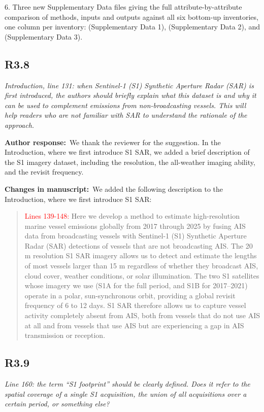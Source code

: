 \documentclass[11pt]{article}
\newcommand{\point}[1]{\subsection*{\normalfont\bfseries #1}}
\newcommand{\response}{\par\medskip\noindent%
  \textbf{\textcolor{respblue}{Author response:}}\ }
\newcommand{\changes}{\par\medskip\noindent%
  \textbf{\textcolor{changegreen}{Changes in manuscript:}}\ }
\begin{document}
6. Three new Supplementary Data files giving the full attribute-by-attribute comparison of methods, inputs and outputs against all six bottom-up inventories, one column per inventory:  (Supplementary Data 1),  (Supplementary Data 2), and  (Supplementary Data 3).


\point{R3.8}

\begin{refquote}\itshape
Introduction, line 131: when Sentinel-1 (S1) Synthetic Aperture Radar (SAR) is first introduced, the authors should briefly explain what this dataset is and why it can be used to complement emissions from non-broadcasting vessels. This will help readers who are not familiar with SAR to understand the rationale of the approach.

\end{refquote}

\response We thank the reviewer for the suggestion. In the Introduction, where we first introduce S1 SAR, we added a brief description of the S1 imagery dataset, including the resolution, the all-weather imaging ability, and the revisit frequency.

\changes We added the following description to the Introduction, where we first introduce S1 SAR:

\begin{quote}
\textcolor{red}{Lines 139-148:} Here we develop a method to estimate high-resolution marine vessel emissions globally from 2017 through 2025 by fusing AIS data from broadcasting vessels with Sentinel-1 (S1) Synthetic Aperture Radar (SAR) detections of vessels that are not broadcasting AIS. The 20 m resolution S1 SAR imagery allows us to detect and estimate the lengths of most vessels larger than 15 m regardless of whether they broadcast AIS, cloud cover, weather conditions, or solar illumination. The two S1 satellites whose imagery we use (S1A for the full period, and S1B for 2017--2021) operate in a polar, sun-synchronous orbit, providing a global revisit frequency of 6 to 12 days. S1 SAR therefore allows us to capture vessel activity completely absent from AIS, both from vessels that do not use AIS at all and from vessels that use AIS but are experiencing a gap in AIS transmission or reception. 
\end{quote}

\point{R3.9}

\begin{refquote}\itshape
Line 160: the term ``S1 footprint'' should be clearly defined. Does it refer to
the spatial coverage of a single S1 acquisition, the union of all acquisitions
over a certain period, or something else?

\end{refquote}
\end{document}
